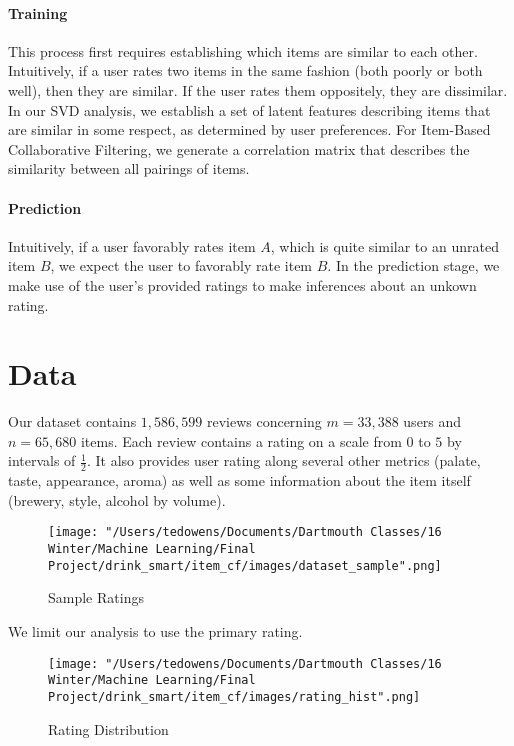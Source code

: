 \documentclass[12pt]{article}
\begin{document}
\paragraph{Training} This process first requires establishing which items are similar to each other. Intuitively, if a user rates two items in the same fashion (both poorly or both well), then they are similar. If the user rates them oppositely, they are dissimilar. In our SVD analysis, we establish a set of latent features describing items that are similar in some respect, as determined by user preferences. For Item-Based Collaborative Filtering, we generate a correlation matrix that describes the similarity between all pairings of items.

\paragraph{Prediction} Intuitively, if a user favorably rates item $A$, which is quite similar to an unrated item $B$, we expect the user to favorably rate item $B$. In the prediction stage, we make use of the user's provided ratings to make inferences about an unkown rating.

\section{Data}
Our dataset contains $1,586,599$ reviews concerning $m = 33,388$ users and $n = 65,680$ items. Each review contains a rating on a scale from $0$ to $5$ by intervals of $\frac{1}{2}$. It also provides user rating along several other metrics (palate, taste, appearance, aroma) as well as some information about the item itself (brewery, style, alcohol by volume).

\begin{figure}[!ht]
\begin{center}
\caption{Sample Ratings}
    \texttt{[image: "/Users/tedowens/Documents/Dartmouth Classes/16 Winter/Machine Learning/Final Project/drink\_smart/item\_cf/images/dataset\_sample".png]}
\end{center}
\end{figure}

We limit our analysis to use the primary rating.

\begin{figure}[!ht]
\begin{center}
\caption{Rating Distribution}
    \texttt{[image: "/Users/tedowens/Documents/Dartmouth Classes/16 Winter/Machine Learning/Final Project/drink\_smart/item\_cf/images/rating\_hist".png]}
\end{center}
\end{figure}
\end{document}

